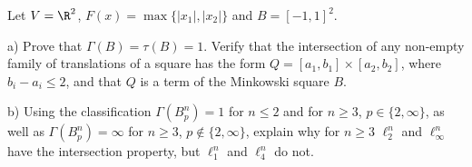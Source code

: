 \documentclass[a4paper,12pt]{report}
\begin{document}
\begin{task}
Let $V=\R^2$, $F(x)=\max\{|x_1|,|x_2|\}$ and $B=[-1,1]^2$.

\textup{a)} Prove that $\Gamma(B)=\tau(B)=1$. Verify that the intersection of any non-empty family of translations of a square has the form $Q=[a_1,b_1]\times[a_2,b_2]$, where $b_i-a_i\le2$, and that $Q$ is a term of the Minkowski square $B$.

\textup{b)} Using the classification $\Gamma(B_p^n)=1$ for $n\le2$ and for $n\ge3$, $p\in\{2,\infty\}$, as well as $\Gamma(B_p^n)=\infty$ for $n\ge3$, $p\notin\{2,\infty\}$, explain why for $n\ge3$ $\ell_2^n$ and $\ell_\infty^n$ have the intersection property, but $\ell_1^n$ and $\ell_4^n$ do not.

\end{task}
\end{document}
